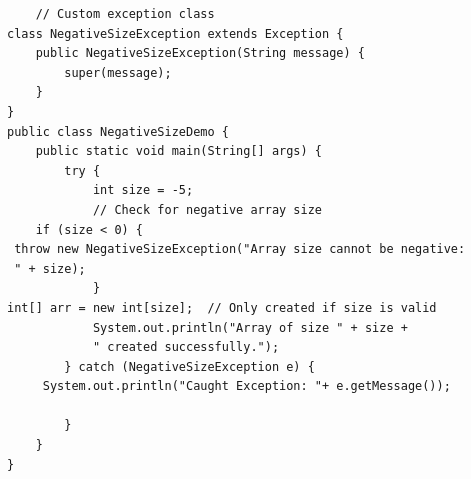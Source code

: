 \begin{verbatim}
    // Custom exception class
class NegativeSizeException extends Exception {
    public NegativeSizeException(String message) {
        super(message);
    }
}
public class NegativeSizeDemo {
    public static void main(String[] args) {
        try {
            int size = -5; 
            // Check for negative array size
    if (size < 0) {
 throw new NegativeSizeException("Array size cannot be negative:
 " + size);
            }
int[] arr = new int[size];  // Only created if size is valid
            System.out.println("Array of size " + size +
            " created successfully.");
        } catch (NegativeSizeException e) {
     System.out.println("Caught Exception: "+ e.getMessage());
        
        }
    }
}
\end{verbatim}